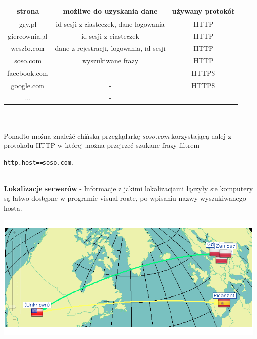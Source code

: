 \documentclass{article}
\begin{document}
\begin{enumerate}[]
\\
\\
\begin{table}[h]
\def\arraystretch{1.5}%
\begin{tabular}{|c|c|c|}
\hline
strona        & możliwe do uzyskania dane               & używany protokół \\ \hline
gry.pl        & id sesji z ciasteczek, dane logowania   & HTTP             \\ \hline
giercownia.pl & id sesji z ciasteczek                   & HTTP             \\ \hline
weszło.com    & dane z rejestracji, logowania, id sesji & HTTP             \\ \hline
soso.com      & wyszukiwane frazy                       & HTTP             \\ \hline
facebook.com  & -                                       & HTTPS            \\ \hline
google.com    & -                                       & HTTPS            \\ \hline
...           & -                                       &                  \\ \hline
\end{tabular}
\end{table}
\\
\\
Ponadto można znaleźć chińską przeglądarkę \textit{soso.com} korzystającą dalej z protokołu HTTP w której można przejrzeć szukane frazy filtrem \begin{small}\texttt{http.host==soso.com}.
\end{small}
\\
\textbf{Lokalizacje serwerów} - Informacje z jakimi lokalizacjami łączyły sie komputery są łatwo dostępne w programie visual route, po wpisaniu nazwy wyszukiwanego hosta.
\end{enumerate}
  \includegraphics[width=\textwidth]{img2/weszlo.png}
\end{document}
